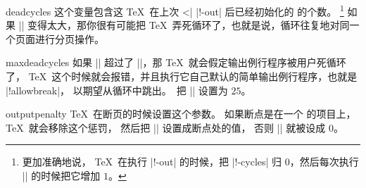 
\begindesc
\cts deadcycles {}
\explain
这个变量包含这 \TeX\ 在上次 ^^|\shipout| |\ship!-out| 后已经初始化的  的个数。
\footnote{更加准确地说， \TeX\ 在执行 |\ship!-out| 的时候，把 |\dead!-cycles| 归 $0$，然后每次执行 |\output| 的时候把它增加 $1$。}
如果 |\deadcycles| 变得太大，那你很有可能把 \TeX\ 弄死循环了，也就是说，循环往复地对同一个页面进行分页操作。
\enddesc



\begindesc
\cts maxdeadcycles {}
\explain
如果 |\deadcycles| 超过了 |\maxdeadcycles|，那 \TeX\ 就会假定输出例行程序被用户死循环了，
\TeX\ 这个时候就会报错，并且执行它自己默认的简单输出例行程序，也就是 |\shipout!allowbreak|，
以期望从循环中跳出。\PlainTeX\ 把 |\maxdeadcycles| 设置为 \hbox{$25$}。
\enddesc

%

\begindesc
\cts outputpenalty {}
\explain
\TeX\ 在断页的时候设置这个参数。
如果断点是在一个  的项目上，\TeX\ 就会移除这个惩罚，
然后把 |\outputpenalty| 设置成断点处的值， 否则 |\outputpenalty| 就被设成 \hbox{$0$}。

